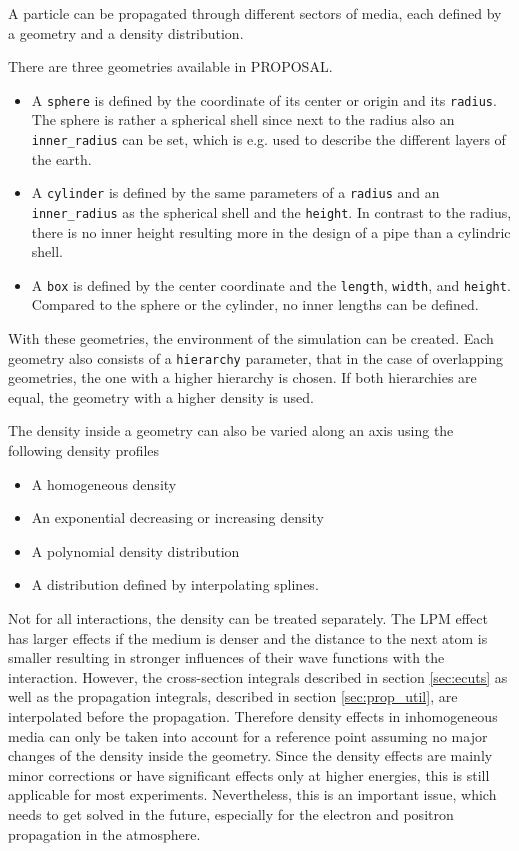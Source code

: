 A particle can be propagated through different sectors of media, each defined by a geometry and a density distribution.

There are three geometries available in PROPOSAL.
\begin{itemize}
    \item A \texttt{sphere} is defined by the coordinate of its center or origin and its \texttt{radius}. The sphere is rather a spherical shell since next to the radius also an \texttt{inner\_radius} can be set, which is e.g. used to describe the different layers of the earth.
    \item A \texttt{cylinder} is defined by the same parameters of a \texttt{radius} and an \texttt{inner\_radius} as the spherical shell and the \texttt{height}. In contrast to the radius, there is no inner height resulting more in the design of a pipe than a cylindric shell.
    \item A \texttt{box} is defined by the center coordinate and the \texttt{length}, \texttt{width}, and \texttt{height}. Compared to the sphere or the cylinder, no inner lengths can be defined.
\end{itemize}
With these geometries, the environment of the simulation can be created.
Each geometry also consists of a \texttt{hierarchy} parameter, that in the case of overlapping geometries, the one with a higher hierarchy is chosen.
If both hierarchies are equal, the geometry with a higher density is used.

The density inside a geometry can also be varied along an axis using the following density profiles
\begin{itemize}
    \item A homogeneous density
    \item An exponential decreasing or increasing density
    \item A polynomial density distribution
    \item A distribution defined by interpolating splines.
\end{itemize}
Not for all interactions, the density can be treated separately.
The LPM effect has larger effects if the medium is denser and the distance to the next atom is smaller resulting in stronger influences of their wave functions with the interaction.
However, the cross-section integrals described in section \ref{sec:ecuts} as well as the propagation integrals, described in section \ref{sec:prop_util}, are interpolated before the propagation.
Therefore density effects in inhomogeneous media can only be taken into account for a reference point assuming no major changes of the density inside the geometry.
Since the density effects are mainly minor corrections or have significant effects only at higher energies, this is still applicable for most experiments.
Nevertheless, this is an important issue, which needs to get solved in the future, especially for the electron and positron propagation in the atmosphere.

